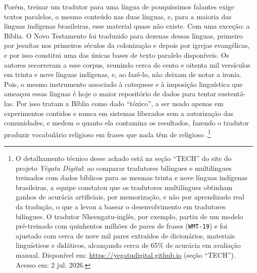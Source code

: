 Porém, treinar um tradutor para uma língua de pouquíssimos falantes exige textos paralelos, o mesmo conteúdo nas duas línguas, e, para a maioria das línguas indígenas brasileiras, esse material quase não existe. Com uma exceção: a Bíblia. O Novo Testamento foi traduzido para dezenas dessas línguas, primeiro por jesuítas nos primeiros séculos da colonização e depois por igrejas evangélicas, e por isso constitui uma das únicas bases de texto paralelo disponíveis. Os autores recorreram a esse corpus, reunindo cerca de cento e oitenta mil versículos em trinta e nove línguas indígenas, e, ao fazê-lo, não deixam de notar a ironia. Pois, o mesmo instrumento associado à catequese e à imposição linguística que ameaçou essas línguas é hoje o maior repositório de dados para tentar sustentá-las. Por isso tratam a Bíblia como dado \enquote{tóxico}, a ser usado apenas em experimentos contidos e nunca em sistemas liberados sem a autorização das comunidades, e medem o quanto ela contamina os resultados, fazendo o tradutor produzir vocabulário religioso em frases que nada têm de religioso \parencite{Pinhanez2024Harnessing}.\footnote{O detalhamento técnico desse achado está na seção \enquote{TECH} do site do projeto \textit{Yẽgatu Digital}: ao comparar tradutores bilíngues e multilíngues treinados com dados bíblicos para as mesmas trinta e nove línguas indígenas brasileiras, a equipe constatou que os tradutores multilíngues obtinham ganhos de acurácia artificiais, por memorização, e não por aprendizado real da tradução, o que a levou a basear o desenvolvimento em tradutores bilíngues. O tradutor Nheengatu-inglês, por exemplo, partiu de um modelo pré-treinado com quinhentos milhões de pares de frases (\texttt{WMT-19}) e foi ajustado com cerca de nove mil pares extraídos de dicionários, materiais linguísticos e didáticos, alcançando cerca de 65\% de acurácia em avaliação manual. Disponível em: \url{https://yegatudigital.github.io} (seção \enquote{TECH}). Acesso em: 2 jul. 2026.}


